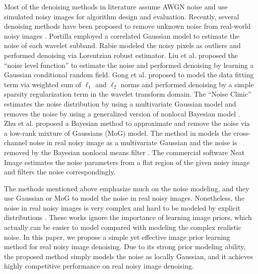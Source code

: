 Most of the denoising methods in literature \cite{bayesshrink,curvelet,ksvd,lssc,ncsr,bm3d,cbm3d,
zhou2012nonparametric,Tomasi1998,blsgsm,nlm,nlbayes,wnnm,pgpd,foe,epll,
mlp,xie2012image,zhang2017beyond,barbu2009training,csf,chen2015learning} assume AWGN noise and use simulated noisy images for algorithm design and evaluation. Recently, several denoising methods have been proposed to remove unknown noise from real-world noisy images \cite{fullyblind,rabie2005robust,Liu2008,almapg,crosschannel2016,Zhu_2016_CVPR,noiseclinic,ncwebsite}. Portilla \cite{fullyblind} employed a correlated Gaussian model to estimate the noise of each wavelet subband. Rabie \cite{rabie2005robust} modeled the noisy pixels as outliers and performed denoising via Lorentzian robust estimator. Liu et al. \cite{Liu2008} proposed the ``noise level function'' to estimate the noise and performed denoising by learning a Gaussian conditional random field. Gong et al. \cite{almapg} proposed to model the data fitting term via weighted sum of $\ell_{1}$ and $\ell_{2}$ norms and performed denoising by a simple sparsity regularization term in the wavelet transform domain. The ``Noise Clinic'' \cite{noiseclinic,ncwebsite} estimates the noise distribution by using a multivariate Gaussian model and removes the noise by using a generalized version of nonlocal Bayesian model \cite{nlbayes}. Zhu et al. \cite{Zhu_2016_CVPR} proposed a Bayesian method to approximate and remove the noise via a low-rank mixture of Gaussians (MoG) model. The method in \cite{crosschannel2016} models the cross-channel noise in real noisy image as a multivariate Gaussian and the noise is removed by the Bayesian nonlocal means filter \cite{kervrann2007bayesian}. The commercial software Neat Image \cite{neatimage} estimates the noise parameters from a flat region of the given noisy image and filters the noise correspondingly. 


The methods \cite{fullyblind,rabie2005robust,Liu2008,almapg,crosschannel2016,Zhu_2016_CVPR,noiseclinic,ncwebsite} mentioned above emphasize much on the noise modeling, and they use Gaussian or MoG to model the noise in real noisy images. Nonetheless, the noise in real noisy images is very complex and hard to be modeled by explicit distributions \cite{healey1994radiometric}. These works ignore the importance of learning image priors, which actually can be easier to model compared with modeling the complex realistic noise. In this paper, we propose a simple yet effective image prior learning method for real noisy image denoising. Due to its strong prior modeling ability, the proposed method simply models the noise as locally Gaussian, and it achieves highly competitive performance on real noisy image denoising.


